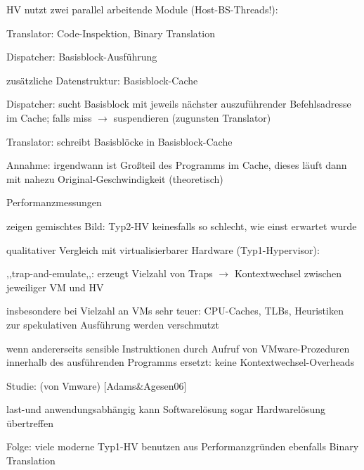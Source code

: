 \documentclass[a4paper]{article}
\begin{document}
\begin{multicols}{3}
    \begin{itemize*}
        \item HV nutzt zwei parallel arbeitende Module (Host-BS-Threads!):
        \begin{itemize*}
            \item Translator: Code-Inspektion, Binary Translation
            \item Dispatcher: Basisblock-Ausführung
        \end{itemize*}
        \item zusätzliche Datenstruktur: Basisblock-Cache
        \item Dispatcher: sucht Basisblock mit jeweils nächster auszuführender
        Befehlsadresse im Cache; falls miss $\rightarrow$
        suspendieren (zugunsten Translator)
        \item Translator: schreibt Basisblöcke in Basisblock-Cache
        \item Annahme: irgendwann ist Großteil des Programms im Cache, dieses läuft
        dann mit nahezu Original-Geschwindigkeit (theoretisch)
    \end{itemize*}

    Performanzmessungen

    \begin{itemize*}
        \item zeigen gemischtes Bild: Typ2-HV keinesfalls so schlecht, wie einst
        erwartet wurde
        \item qualitativer Vergleich mit virtualisierbarer Hardware
        (Typ1-Hypervisor):
        \item ,,trap-and-emulate,,: erzeugt Vielzahl von Traps
        $\rightarrow$ Kontextwechsel zwischen jeweiliger VM
        und HV
        \item insbesondere bei Vielzahl an VMs sehr teuer: CPU-Caches, TLBs,
        Heuristiken zur spekulativen Ausführung werden verschmutzt
        \item wenn andererseits sensible Instruktionen durch Aufruf von
        VMware-Prozeduren innerhalb des ausführenden Programms ersetzt: keine
        Kontextwechsel-Overheads
    \end{itemize*}

    Studie: (von Vmware) [Adams\&Agesen06]

    \begin{itemize*}
        \item last-und anwendungsabhängig kann Softwarelösung sogar Hardwarelösung
        übertreffen
        \item Folge: viele moderne Typ1-HV benutzen aus Performanzgründen ebenfalls
        Binary Translation
    \end{itemize*}



\end{multicols}
\end{document}
